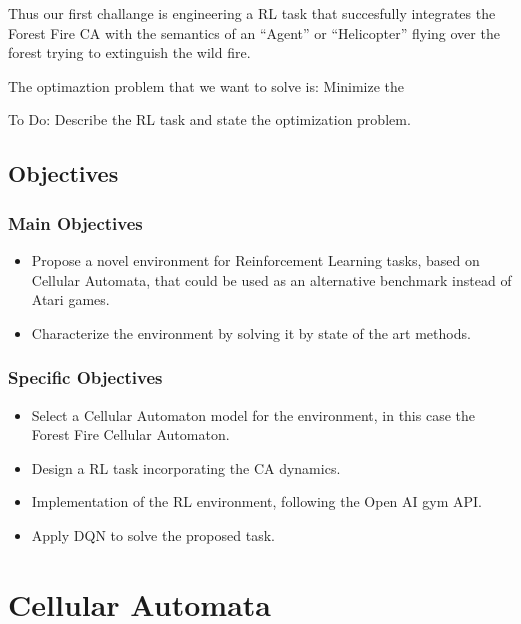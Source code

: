 \documentclass[
  openany]{book}
\providecommand{\tightlist}{%
  \setlength{\itemsep}{0pt}\setlength{\parskip}{0pt}}
\begin{document}
Thus our first challange is engineering a RL task that succesfully integrates the Forest Fire CA with the semantics of an ``Agent'' or ``Helicopter'' flying over the forest trying to extinguish the wild fire.

The optimaztion problem that we want to solve is: Minimize the

To Do: Describe the RL task and state the optimization problem.

\hypertarget{objectives}{%
\section{Objectives}\label{objectives}}

\hypertarget{main-objectives}{%
\subsection{Main Objectives}\label{main-objectives}}

\begin{itemize}
\tightlist
\item
  Propose a novel environment for Reinforcement Learning tasks, based on Cellular Automata, that could be used as an alternative benchmark instead of Atari games.
\item
  Characterize the environment by solving it by state of the art methods.
\end{itemize}

\hypertarget{specific-objectives}{%
\subsection{Specific Objectives}\label{specific-objectives}}

\begin{itemize}
\tightlist
\item
  Select a Cellular Automaton model for the environment, in this case the Forest Fire Cellular Automaton.
\item
  Design a RL task incorporating the CA dynamics.
\item
  Implementation of the RL environment, following the Open AI gym API.
\item
  Apply DQN to solve the proposed task.
\end{itemize}

\hypertarget{cellular-automata}{%
\chapter{Cellular Automata}\label{cellular-automata}}
\end{document}
